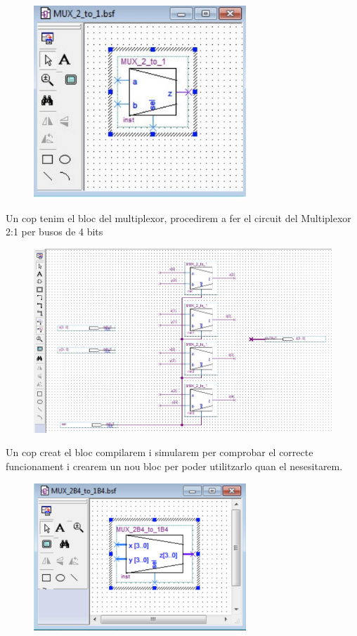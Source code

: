\documentclass[12pt, a4papre]{article}
\begin{document}
	\begin{figure}[H]
		\begin{center}
		\includegraphics[width=80mm]{blocmultiplexor.jpeg}
		\end{center}
	\end{figure}
		
	Un cop tenim el bloc del multiplexor, procedirem a fer el circuit del Multiplexor 2:1 per busos de 4 bits
		\begin{figure}[H]
		\begin{center}
		\includegraphics[width=150mm]{mult4bits.jpeg}
		\end{center}
	\end{figure}
	
		Un cop creat el bloc compilarem i simularem per comprobar el correcte funcionament i crearem un nou bloc per poder utilitzarlo quan el nesesitarem.
	
	\begin{figure}[H]
		\begin{center}
		\includegraphics[width=80mm]{blocnoumult.jpeg}
		\end{center}
	\end{figure}
	
\end{document}
